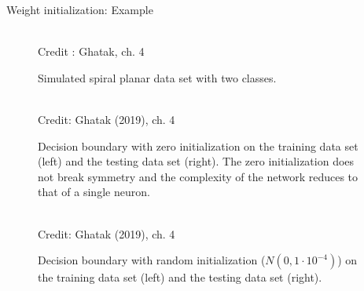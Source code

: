 \begin{vbframe}{Weight initialization: Example}
\begin{figure}
      \tiny{\\ Credit : Ghatak, ch. 4}
      \caption{Simulated spiral planar data set with two classes.}
  \end{figure}
  \framebreak
  \begin{figure}
    \centering
      \tiny{\\ Credit: Ghatak (2019), ch. 4}
      \caption{Decision boundary with zero initialization on the training data set (left) and the testing data set (right). The zero initialization does not break symmetry and the complexity of the network reduces to that of a single
neuron.}
  \end{figure}
    \framebreak
  \begin{figure}
    \centering
      \tiny{\\ Credit: Ghatak (2019), ch. 4}
      \caption{Decision boundary with random initialization ($N\left(0, 1\cdot 10 ^{-4}\right)$) on the training data set (left) and the testing data set (right).}
  \end{figure}
      \framebreak
  \begin{figure}
    \centering

\end{figure}
\end{vbframe}
